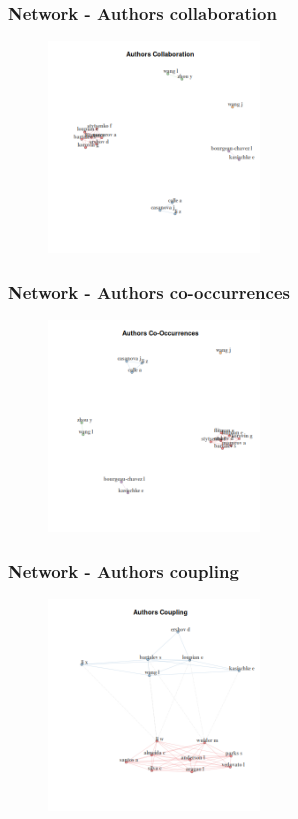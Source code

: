 \documentclass[aspectratio=169]{beamer}
\begin{document}
\begin{frame}
	\frametitle{Network - Authors collaboration}
	\begin{figure}
		\centering
		\includegraphics[width=0.5\textwidth]
		{figures/bnet_authors_collaboration.png}
	\end{figure}
\end{frame}

\begin{frame}
	\frametitle{Network - Authors co-occurrences}
	\begin{figure}
		\centering
		\includegraphics[width=0.5\textwidth]
		{figures/bnet_authors_co-occurrences.png}
	\end{figure}
\end{frame}

\begin{frame}
	\frametitle{Network - Authors coupling}
	\begin{figure}
		\centering
		\includegraphics[width=0.5\textwidth]
		{figures/bnet_authors_coupling.png}
	\end{figure}
\end{frame}
\end{document}

